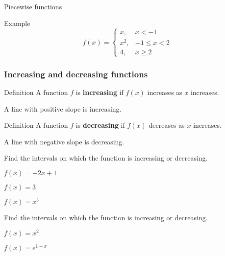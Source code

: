 \documentclass[t]{beamer}
\newenvironment{fpi}
  {\itemize[nolistsep,itemsep=\fill]}
  {\vfill\enditemize}
\begin{document}
\begin{frame}{Piecewise functions}
\begin{block}{Example}
$$
f(x) = \begin{cases}
x, & x < -1 \\
x^2, &  -1 \le x < 2 \\
4, & x \ge 2
\end{cases}
$$
\end{block}

\end{frame}


\begin{frame}
\frametitle{Increasing and decreasing functions}
\begin{block}{Definition}
A function $f$ is \textbf{increasing} if $f(x)$ increases as $x$ increases.
\end{block}
A line with positive slope is increasing.
\begin{block}{Definition}
A function $f$ is \textbf{decreasing} if $f(x)$ decreases as $x$ increases.
\end{block}
A line with negative slope is decreasing.
\end{frame}

\begin{frame}{Find the intervals on which the function is increasing or decreasing.}
\begin{fpi}
\item $\displaystyle f(x) = -2x + 1$
\item $\displaystyle f(x) = 3$
\item $\displaystyle f(x) = x^3$
\end{fpi}
\end{frame}

\begin{frame}{Find the intervals on which the function is increasing or decreasing.}
\begin{fpi}
\item $\displaystyle f(x) = x^2$
\item $\displaystyle f(x) = e^{1-x}$
\end{fpi}
\end{frame}
\end{document}
